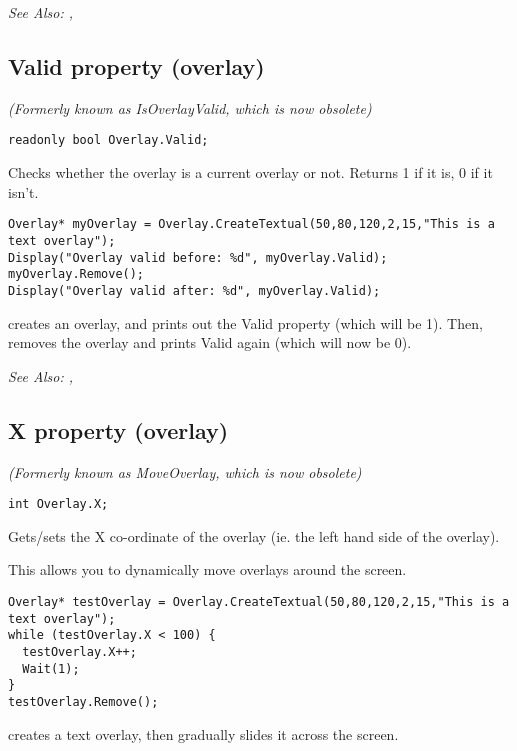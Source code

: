 \it{See Also:} ,


\subsection{Valid property (overlay)}\label{Overlay.Valid}%

\it{(Formerly known as IsOverlayValid, which is now obsolete)}

\begin{verbatim}
readonly bool Overlay.Valid;
\end{verbatim}
Checks whether the overlay is a current overlay or not.
Returns 1 if it is, 0 if it isn't.

\begin{verbatim}
Overlay* myOverlay = Overlay.CreateTextual(50,80,120,2,15,"This is a text overlay");
Display("Overlay valid before: %d", myOverlay.Valid);
myOverlay.Remove();
Display("Overlay valid after: %d", myOverlay.Valid);
\end{verbatim}
creates an overlay, and prints out the Valid property (which will be 1). Then, removes
the overlay and prints Valid again (which will now be 0).

\it{See Also:} ,



\subsection{X property (overlay)}\label{Overlay.X}%

\it{(Formerly known as MoveOverlay, which is now obsolete)}

\begin{verbatim}
int Overlay.X;
\end{verbatim}
Gets/sets the X co-ordinate of the overlay (ie. the left hand side of the overlay).

This allows you to dynamically move overlays around the screen.

\begin{verbatim}
Overlay* testOverlay = Overlay.CreateTextual(50,80,120,2,15,"This is a text overlay");
while (testOverlay.X < 100) {
  testOverlay.X++;
  Wait(1);
}
testOverlay.Remove();
\end{verbatim}
creates a text overlay, then gradually slides it across the screen.

